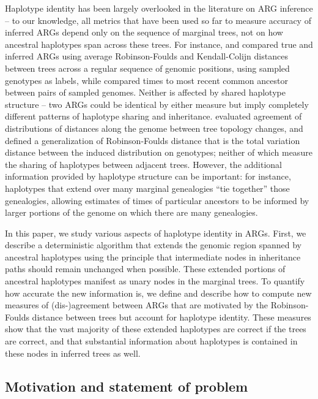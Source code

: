\documentclass[10pt,twoside,lineno]{gsajnl}
\begin{document}
Haplotype identity has been largely overlooked in the literature on ARG inference --
to our knowledge, all metrics that have been used so far to measure accuracy of inferred ARGs
depend only on the sequence of marginal trees,
not on how ancestral haplotypes span across these trees.
For instance, \citet{kelleher2019inferring} and \citet{zhang2023biobankscale}
compared true and inferred ARGs
using average Robinson-Foulds and Kendall-Colijn distances between trees
across a regular sequence of genomic positions,
using sampled genotypes as labels,
while \citet{brandt2022evaluation} compared times to most recent common ancestor
between pairs of sampled genomes.
Neither is affected by shared haplotype structure --
two ARGs could be identical by either measure
but imply completely different patterns of haplotype sharing and inheritance.
\citet{deng2021distribution} evaluated agreement of distributions of
distances along the genome between tree topology changes,
and \citet{zhang2023biobankscale} defined a generalization of Robinson-Foulds distance
that is the total variation distance between the induced distribution on genotypes;
neither of which measure the sharing of haplotypes between adjacent trees.
However, the additional information provided by haplotype structure can be important:
for instance, haplotypes that extend over many marginal genealogies
``tie together'' those genealogies, allowing estimates of times of particular ancestors
to be informed by larger portions of the genome on which there are many genealogies.

In this paper, we study various aspects of haplotype identity in ARGs.
First, we describe a deterministic algorithm that
extends the genomic region spanned by ancestral haplotypes
using the principle that intermediate nodes in inheritance paths
should remain unchanged when possible.
These extended portions of ancestral haplotypes manifest as unary nodes in the marginal trees.
To quantify how accurate the new information is,
we define and describe how to compute new measures of (dis-)agreement between ARGs
that are motivated by the Robinson-Foulds distance between trees
but account for haplotype identity.
These measures show that the vast majority of these extended haplotypes are correct if the trees are correct,
and that substantial information about haplotypes is contained in these nodes
in inferred trees as well.


\subsection{Motivation and statement of problem}
\end{document}
